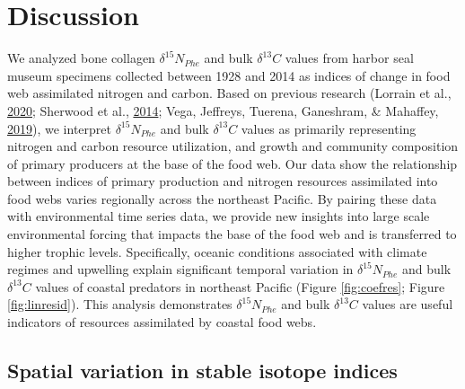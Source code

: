 \documentclass [11pt, proquest] {uwthesis}[2015/03/03]
\begin{document}
\section{Discussion}\label{discussion-1}

We analyzed bone collagen \(\delta^{15}N_{Phe}\) and bulk
\(\delta^{13}C\) values from harbor seal museum specimens collected
between 1928 and 2014 as indices of change in food web assimilated
nitrogen and carbon. Based on previous research (Lorrain et al.,
\protect\hyperlink{ref-Lorrain2020}{2020}; Sherwood et al.,
\protect\hyperlink{ref-Sherwood2014}{2014}; Vega, Jeffreys, Tuerena,
Ganeshram, \& Mahaffey, \protect\hyperlink{ref-delaVega2019}{2019}), we
interpret \(\delta^{15}N_{Phe}\) and bulk \(\delta^{13}C\) values as
primarily representing nitrogen and carbon resource utilization, and
growth and community composition of primary producers at the base of the
food web. Our data show the relationship between indices of primary
production and nitrogen resources assimilated into food webs varies
regionally across the northeast Pacific. By pairing these data with
environmental time series data, we provide new insights into large scale
environmental forcing that impacts the base of the food web and is
transferred to higher trophic levels. Specifically, oceanic conditions
associated with climate regimes and upwelling explain significant
temporal variation in \(\delta^{15}N_{Phe}\) and bulk \(\delta^{13}C\)
values of coastal predators in northeast Pacific (Figure
\ref{fig:coefres}; Figure \ref{fig:linresid}). This analysis
demonstrates \(\delta^{15}N_{Phe}\) and bulk \(\delta^{13}C\) values are
useful indicators of resources assimilated by coastal food webs.

\subsection{Spatial variation in stable isotope
indices}\label{spatial-variation-in-stable-isotope-indices}
\end{document}
